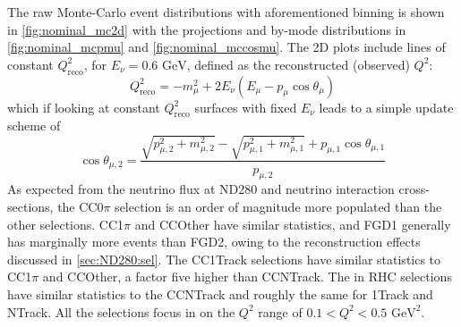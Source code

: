 The raw Monte-Carlo \pmu \cosmu event distributions with aforementioned binning is shown in \autoref{fig:nominal_mc2d} with the projections and by-mode distributions in \autoref{fig:nominal_mcpmu} and \autoref{fig:nominal_mccosmu}. The 2D plots include lines of constant $Q^2_{\text{reco}}$, for $E_\nu = 0.6 \text{ GeV}$, defined as the reconstructed (observed) $Q^2$:
\begin{equation}
Q^2_{\text{reco}} = -m^2_\mu + 2E_\nu \left( E_\mu-p_\mu\cos\theta_\mu \right)
\end{equation}
which if looking at constant $Q^2_{\text{reco}}$ surfaces with fixed $E_\nu$ leads to a simple update scheme of
\begin{equation}
\cos\theta_{\mu, 2} = \frac{\sqrt{p_{\mu,2}^2+m_{\mu,2}^2} - \sqrt{p_{\mu,1}^2+m_{\mu,1}^2}+p_{\mu,1}\cos\theta_{\mu,1}}{p_{\mu,2}}
\end{equation}
As expected from the neutrino flux at ND280 and neutrino interaction cross-sections, the CC0$\pi$ selection is an order of magnitude more populated than the other \numu selections. CC1$\pi$ and CCOther have similar statistics, and FGD1 generally has marginally more events than FGD2, owing to the reconstruction effects discussed in \autoref{sec:ND280:sel}. The \numubar CC1Track selections have similar statistics to \numu CC1$\pi$ and CCOther, a factor five higher than \numubar CCNTrack. The \numu in RHC selections have similar statistics to the \numubar CCNTrack and roughly the same for 1Track and NTrack. All the selections focus in on the $Q^2$ range of $0.1 < Q^2 < 0.5 \text{ GeV}^2$.
